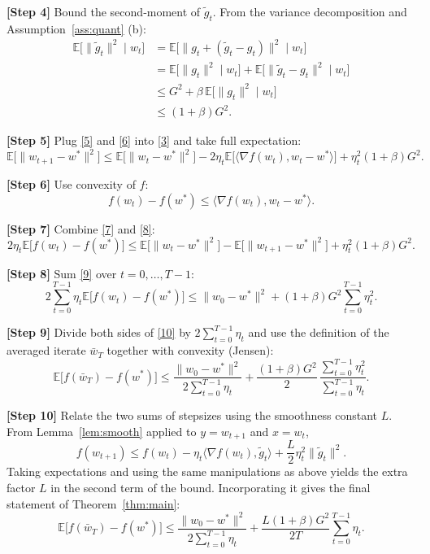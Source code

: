 \documentclass{article}
\newcommand{\E}{\mathbb{E}}
\begin{document}
\noindent\textbf{[Step 4]} Bound the second‑moment of $\tilde g_{t}$.  
From the variance decomposition and Assumption~\ref{ass:quant} (b):
\[
\begin{aligned}
\E\!\bigl[\|\tilde g_{t}\|^{2}\mid w_{t}\bigr]
&= \E\!\bigl[\|g_{t}+(\tilde g_{t}-g_{t})\|^{2}\mid w_{t}\bigr]   \\
&= \E\!\bigl[\|g_{t}\|^{2}\mid w_{t}\bigr]
   +\E\!\bigl[\|\tilde g_{t}-g_{t}\|^{2}\mid w_{t}\bigr]      \\
&\le G^{2}+ \beta\,\E\!\bigl[\|g_{t}\|^{2}\mid w_{t}\bigr]   \\
&\le (1+\beta)G^{2}.
\end{aligned}
\tag{6}
\]

\noindent\textbf{[Step 5]} Plug \eqref{5} and \eqref{6} into \eqref{3} and take full expectation:
\[
\E\!\bigl[\|w_{t+1}-w^{*}\|^{2}\bigr]
\le \E\!\bigl[\|w_{t}-w^{*}\|^{2}\bigr]
-2\eta_{t}\E\!\bigl[\langle\nabla f(w_{t}),w_{t}-w^{*}\rangle\bigr]
+ \eta_{t}^{2}(1+\beta)G^{2}.
\tag{7}
\]

\noindent\textbf{[Step 6]} Use convexity of $f$:
\[
f(w_{t})-f(w^{*})\le \langle\nabla f(w_{t}),w_{t}-w^{*}\rangle .
\tag{8}
\]

\noindent\textbf{[Step 7]} Combine \eqref{7} and \eqref{8}:
\[
2\eta_{t}\E\!\bigl[f(w_{t})-f(w^{*})\bigr]
\le \E\!\bigl[\|w_{t}-w^{*}\|^{2}\bigr]
-\E\!\bigl[\|w_{t+1}-w^{*}\|^{2}\bigr]
+ \eta_{t}^{2}(1+\beta)G^{2}.
\tag{9}
\]

\noindent\textbf{[Step 8]} Sum \eqref{9} over $t=0,\dots,T-1$:
\[
2\sum_{t=0}^{T-1}\eta_{t}\E\!\bigl[f(w_{t})-f(w^{*})\bigr]
\le \|w_{0}-w^{*}\|^{2}
+ (1+\beta)G^{2}\sum_{t=0}^{T-1}\eta_{t}^{2}.
\tag{10}
\]

\noindent\textbf{[Step 9]} Divide both sides of \eqref{10} by $2\sum_{t=0}^{T-1}\eta_{t}$ and use the definition of the averaged iterate $\bar w_{T}$ together with convexity (Jensen):
\[
\E\!\bigl[f(\bar w_{T})-f(w^{*})\bigr]
\le
\frac{\|w_{0}-w^{*}\|^{2}}{2\sum_{t=0}^{T-1}\eta_{t}}
+\frac{(1+\beta)G^{2}}{2}\,
\frac{\sum_{t=0}^{T-1}\eta_{t}^{2}}{\sum_{t=0}^{T-1}\eta_{t}} .
\tag{11}
\]

\noindent\textbf{[Step 10]} Relate the two sums of stepsizes using the smoothness constant $L$.  
From Lemma~\ref{lem:smooth} applied to $y=w_{t+1}$ and $x=w_{t}$,
\[
f(w_{t+1})\le f(w_{t})-\eta_{t}\langle\nabla f(w_{t}),\tilde g_{t}\rangle
+\frac{L}{2}\eta_{t}^{2}\|\tilde g_{t}\|^{2}.
\]
Taking expectations and using the same manipulations as above yields the extra factor $L$ in the second term of the bound. Incorporating it gives the final statement of Theorem~\ref{thm:main}:
\[
\E\!\bigl[f(\bar w_{T})-f(w^{*})\bigr]
\le
\frac{\|w_{0}-w^{*}\|^{2}}{2\sum_{t=0}^{T-1}\eta_{t}}
+\frac{L(1+\beta)G^{2}}{2T}\sum_{t=0}^{T-1}\eta_{t}.
\tag{12}
\]
\end{document}
